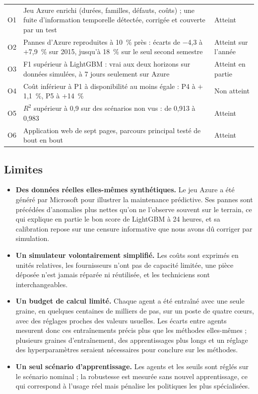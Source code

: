 \begin{tabularx}{\linewidth}{@{}l L P{3.2cm}@{}}
\caption{Atteinte des objectifs du cahier des charges}\label{tab:objectifs}\\
\toprule
{} &  &  \\
\midrule
O1 & Jeu Azure enrichi (durées, familles, défauts, coûts) ; une fuite d'information temporelle détectée, corrigée et couverte par un test & Atteint \\
O2 & Pannes d'Azure reproduites à 10~\% près : écarts de $-$4,3 à $+$7,9~\% sur 2015, jusqu'à 18~\% sur le seul second semestre & Atteint sur l'année \\
O3 & F1 supérieur à LightGBM : vrai aux deux horizons sur données simulées, à 7 jours seulement sur Azure & Atteint en partie \\
O4 & Coût inférieur à P1 à disponibilité au moins égale : P4 à $+$1,1~\%, P5 à $+$14~\% & Non atteint \\
O5 & $R^2$ supérieur à 0,9 sur des scénarios non vus : de 0,913 à 0,983 & Atteint \\
O6 & Application web de sept pages, parcours principal testé de bout en bout & Atteint \\
\bottomrule
\end{tabularx}

\subsection{Limites}

\begin{itemize}
\item \textbf{Des données réelles elles-mêmes synthétiques.} Le jeu Azure a été généré par Microsoft pour illustrer la maintenance prédictive. Ses pannes sont précédées d'anomalies plus nettes qu'on ne l'observe souvent sur le terrain, ce qui explique en partie le bon score de LightGBM à 24 heures, et sa calibration repose sur une censure informative que nous avons dû corriger par simulation.
\item \textbf{Un simulateur volontairement simplifié.} Les coûts sont exprimés en unités relatives, les fournisseurs n'ont pas de capacité limitée, une pièce déposée n'est jamais réparée ni réutilisée, et les techniciens sont interchangeables.
\item \textbf{Un budget de calcul limité.} Chaque agent a été entraîné avec une seule graine, en quelques centaines de milliers de pas, sur un poste de quatre cœurs, avec des réglages proches des valeurs usuelles. Les écarts entre agents mesurent donc ces entraînements précis plus que les méthodes elles-mêmes ; plusieurs graines d'entraînement, des apprentissages plus longs et un réglage des hyperparamètres seraient nécessaires pour conclure sur les méthodes.
\item \textbf{Un seul scénario d'apprentissage.} Les agents et les seuils sont réglés sur le scénario nominal ; la robustesse est mesurée sans nouvel apprentissage, ce qui correspond à l'usage réel mais pénalise les politiques les plus spécialisées.
\end{itemize}

